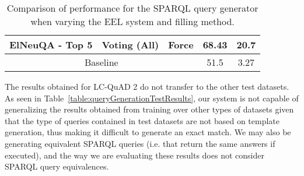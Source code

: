 \begin{table}[h!]
\begin{tabular}{|c|cc|cc|}
    ElNeuQA - Top 5                  & Voting (All)                                                                                                    & Force                                                                               & 68.43                                    & 20.7                   \\ \hline
    \multicolumn{3}{|c|}{Baseline}                                                                                                                                                                                                           & 51.5                                     & 3.27                   \\ \hline
    \end{tabular}%
    \caption{Comparison of performance for the SPARQL query generator when varying the EEL system and filling method.}
    \label{table:queryGenerationResults}
\end{table}

The results obtained for LC-QuAD 2 do not transfer to the other test datasets. As seen in 
Table~\ref{table:queryGenerationTestResults}, our system is not capable of generalizing the results 
obtained from training over other types of datasets given that the type of queries contained in 
test datasets are not based on template generation, thus making it difficult to generate an exact 
match. We may also be generating equivalent SPARQL queries (i.e. that return the same answers if 
executed), and the way we are evaluating these results does not consider SPARQL query equivalences.


